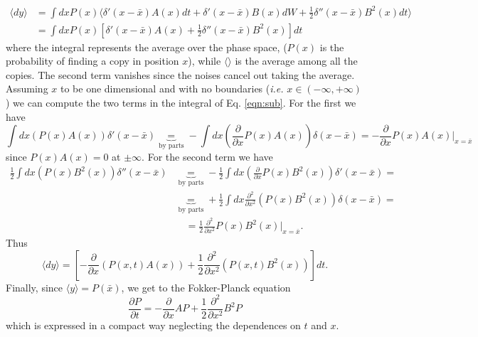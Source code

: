 \begin{equation}
    \begin{split}
        \langle dy \rangle &=\int dxP(x)\Big\langle\delta'(x-\bar{x})A(x)dt+\delta'(x-\bar{x})B(x)dW+\frac{1}{2}\delta''(x-\bar{x})B^2(x)dt\Big\rangle\\
        & =\int dxP(x)\left[\delta'(x-\bar{x})A(x)+\frac{1}{2}\delta''(x-\bar{x})B^2(x)\right]dt \label{eqn:sub}
    \end{split}
\end{equation}
where the integral represents the average over the phase space, ($P(x)$ is the probability of finding a copy in position $x$), while $\langle \rangle$ is the average among all the copies. The second term vanishes since the noises cancel out taking the average.
Assuming $x$ to be one dimensional and with no boundaries (\emph{i.e.} $x \in (-\infty,+\infty)$) we can compute the two terms in the integral of Eq. \eqref{eqn:sub}. For the first we have
\[
\int dx\left(P(x)A(x)\right)\delta'(x-\bar{x})\underbrace{=}_{\text{by parts}}-\int dx\left(\frac{\partial}{\partial x}P(x)A(x)\right)\delta(x-\bar{x})=-\frac{\partial}{\partial x}P(x)A(x)\bigg|_{x=\bar{x}}
\]
since $P(x)A(x)=0$ at $\pm\infty$. For the second term we have
\begin{equation*}
    \begin{split}
\frac{1}{2}\int dx\left(P(x)B^2(x)\right)\delta''(x-\bar{x})&\underbrace{=}_{\text{by parts}}-\frac{1}{2}\int dx\left(\frac{\partial}{\partial x}P(x)B^2(x)\right)\delta'(x-\bar{x})= \\
&\underbrace{=}_{\text{by parts}}+\frac{1}{2}\int dx \frac{\partial^2}{\partial x^2}\left(P(x)B^2(x)\right)\delta(x-\bar{x})= \\
&\,\,\,\,\,\,=\frac{1}{2}\frac{\partial^2}{\partial x^2}P(x)B^2(x)\bigg|_{x=\bar{x}}.
    \end{split}
\end{equation*}
Thus
\begin{equation}
\langle dy \rangle =\left[-\frac{\partial}{\partial x}\left(P(x,t)A(x)\right)+\frac{1}{2}\frac{\partial^2}{\partial x^2}\left( P(x,t)B^2(x)\right)\right]dt.
\end{equation}
Finally, since $\langle y \rangle =P(\bar{x})$, we get to the Fokker-Planck equation
\begin{equation}
\frac{\partial P}{\partial t}=-\frac{\partial}{\partial x}AP+\frac{1}{2}\frac{\partial^2}{\partial x^2}B^2P
\label{Fokker-Planck equation}
\end{equation}
which is expressed in a compact way neglecting the dependences on $t$ and $x$.




